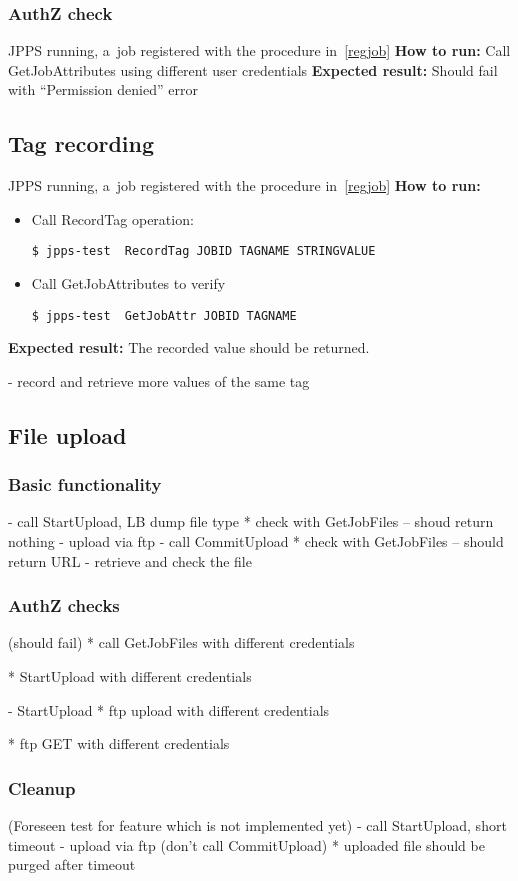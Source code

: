 \documentclass{egee}
\def\how{\noindent\textbf{How to run:}}
\def\result{\noindent\textbf{Expected result:}}
\begin{document}
\subsubsection{AuthZ check}
\pre JPPS running, a~job registered with the procedure in~\ref{regjob}
\how
Call GetJobAttributes using different user credentials 
\result 
Should fail with ``Permission denied'' error

\subsection{Tag recording}
\pre JPPS running, a~job registered with the procedure in~\ref{regjob}
\how 
\begin{itemize}
\item Call RecordTag operation:
\begin{verbatim}
$ jpps-test  RecordTag JOBID TAGNAME STRINGVALUE
\end{verbatim}
\item Call GetJobAttributes to verify
\begin{verbatim}
$ jpps-test  GetJobAttr JOBID TAGNAME
\end{verbatim}
\end{itemize}
\result
The recorded value should be returned.

- record and retrieve more values of the same tag
\subsection{File upload}

\subsubsection{Basic functionality}
- call StartUpload, LB dump file type
* check with GetJobFiles -- shoud return nothing
- upload via ftp
- call CommitUpload
* check with GetJobFiles -- should return URL
- retrieve and check the file

\subsubsection{AuthZ checks}
(should fail)
* call GetJobFiles with different credentials

* StartUpload with different credentials

- StartUpload
* ftp upload with different credentials

* ftp GET with different credentials

\subsubsection{Cleanup}
(Foreseen test for feature which is not implemented yet)
- call StartUpload, short timeout
- upload via ftp
(don't call CommitUpload)
* uploaded file should be purged after timeout
\end{document}
